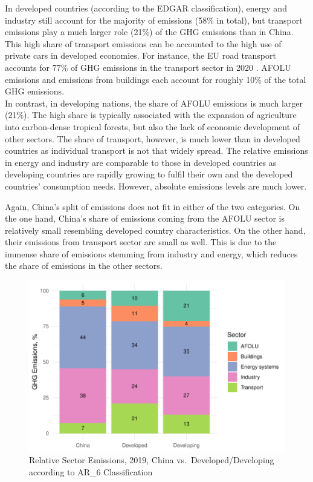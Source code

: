 \documentclass[
  12pt,
]{article}
\numberwithin{equation}{section}
\numberwithin{table}{section}
\numberwithin{figure}{section}
\begin{document}
In developed countries (according to the EDGAR classification), energy
and industry still account for the majority of emissions (58\% in
total), but transport emissions play a much larger role (21\%) of the
GHG emissions than in China. This high share of transport emissions can
be accounted to the high use of private cars in developed economies. For
instance, the EU road transport accounts for 77\% of GHG emissions in
the transport sector in 2020 \citep{EEA2022}. AFOLU emissions and
emissions from buildings each account for roughly 10\% of the total GHG
emissions.\\
In contrast, in developing nations, the share of AFOLU emissions is much
larger (21\%). The high share is typically associated with the expansion
of agriculture into carbon-dense tropical forests, but also the lack of
economic development of other sectors. The share of transport, however,
is much lower than in developed countries as individual transport is not
that widely spread. The relative emissions in energy and industry are
comparable to those in developed countries as developing countries are
rapidly growing to fulfil their own and the developed countries'
consumption needs. However, absolute emissions levels are much lower.

Again, China's split of emissions does not fit in either of the two
categories. On the one hand, China's share of emissions coming from the
AFOLU sector is relatively small resembling developed country
characteristics. On the other hand, their emissions from transport
sector are small as well. This is due to the immense share of emissions
stemming from industry and energy, which reduces the share of emissions
in the other sectors.

\begin{figure}
\centering
\includegraphics{Paper_files/figure-latex/unnamed-chunk-6-1.pdf}
\caption{Relative Sector Emissions, 2019, China vs.~Developed/Developing
according to AR\_6 Classification}
\end{figure}
\end{document}
